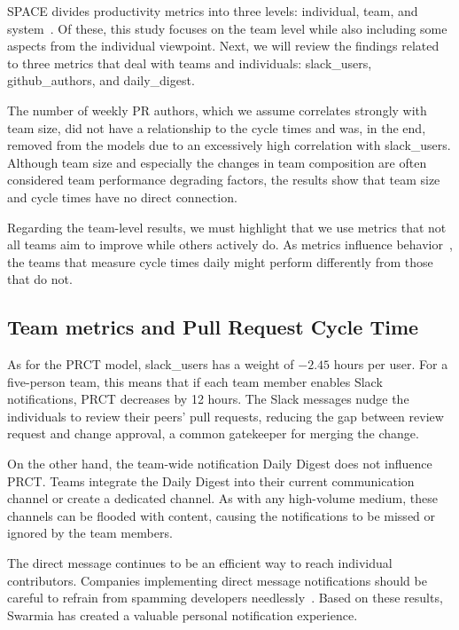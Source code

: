 SPACE divides productivity metrics into three levels: individual, team, and system~\cite{forsgren_space_2021}. Of these, this study focuses on the team level while also including some aspects from the individual viewpoint. Next, we will review the findings related to three metrics that deal with teams and individuals: slack\_users, github\_authors, and daily\_digest.

The number of weekly PR authors, which we assume correlates strongly with team size, did not have a relationship to the cycle times and was, in the end, removed from the models due to an excessively high correlation with slack\_users. Although team size and especially the changes in team composition are often considered team performance degrading factors, the results show that team size and cycle times have no direct connection.

Regarding the team-level results, we must highlight that we use metrics that not all teams aim to improve while others actively do. As metrics influence behavior~\cite{forsgren_space_2021, storey_how_2022}, the teams that measure cycle times daily might perform differently from those that do not. 

\subsection{Team metrics and Pull Request Cycle Time}

As for the PRCT model, slack\_users has a weight of $-2.45$ hours per user. For a five-person team, this means that if each team member enables Slack notifications, PRCT decreases by 12 hours. The Slack messages nudge the individuals to review their peers' pull requests, reducing the gap between review request and change approval, a common gatekeeper for merging the change. 

On the other hand, the team-wide notification Daily Digest does not influence PRCT. Teams integrate the Daily Digest into their current communication channel or create a dedicated channel. As with any high-volume medium, these channels can be flooded with content, causing the notifications to be missed or ignored by the team members.

The direct message continues to be an efficient way to reach individual contributors. Companies implementing direct message notifications should be careful to refrain from spamming developers needlessly~\cite{maddila_nudge_2022}. Based on these results, Swarmia has created a valuable personal notification experience. 

